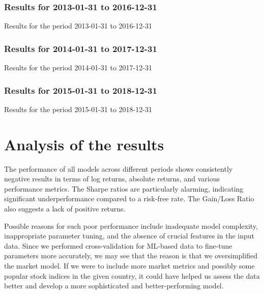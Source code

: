 \documentclass[a4paper,10pt]{article}
\begin{document}
\subsubsection{Results for 2013-01-31 to 2016-12-31}

\begin{table}[h]
  \centering
  \caption{Results for the period 2013-01-31 to 2016-12-31}
  \label{tab:results_2013-01-31_2016-12-31}
\end{table}

\subsubsection{Results for 2014-01-31 to 2017-12-31}

\begin{table}[h]
  \centering
  \caption{Results for the period 2014-01-31 to 2017-12-31}
  \label{tab:results_2014-01-31_2017-12-31}
\end{table}

\clearpage  %

\subsubsection{Results for 2015-01-31 to 2018-12-31}

\begin{table}[h]
  \centering
  \caption{Results for the period 2015-01-31 to 2018-12-31}
  \label{tab:results_2015-01-31_2018-12-31}
\end{table}

\section{Analysis of the results}

The performance of all models across different periods shows consistently negative results in terms of log returns, absolute returns, and various performance metrics. The Sharpe ratios are particularly alarming, indicating significant underperformance compared to a risk-free rate. The Gain/Loss Ratio also suggests a lack of positive returns.

Possible reasons for such poor performance include inadequate model complexity, inappropriate parameter tuning, and the absence of crucial features in the input data. Since we performed cross-validation for ML-based data to fine-tune parameters more accurately, we may see that the reason is that we oversimplified the market model. If we were to include more market metrics and possibly some popular stock indices in the given country, it could have helped us assess the data better and develop a more sophisticated and better-performing model. 
\end{document}
